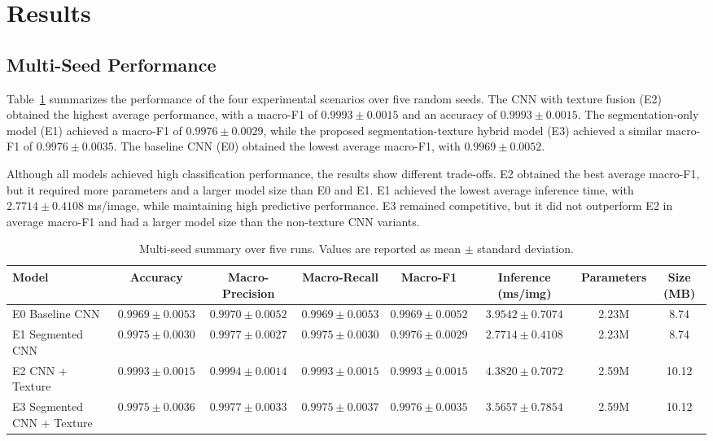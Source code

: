 \section{Results}

\subsection{Multi-Seed Performance}

Table~\ref{tab:multiseed} summarizes the performance of the four experimental scenarios over five random seeds. The CNN with texture fusion (E2) obtained the highest average performance, with a macro-F1 of $0.9993 \pm 0.0015$ and an accuracy of $0.9993 \pm 0.0015$. The segmentation-only model (E1) achieved a macro-F1 of $0.9976 \pm 0.0029$, while the proposed segmentation-texture hybrid model (E3) achieved a similar macro-F1 of $0.9976 \pm 0.0035$. The baseline CNN (E0) obtained the lowest average macro-F1, with $0.9969 \pm 0.0052$.

Although all models achieved high classification performance, the results show different trade-offs. E2 obtained the best average macro-F1, but it required more parameters and a larger model size than E0 and E1. E1 achieved the lowest average inference time, with $2.7714 \pm 0.4108$ ms/image, while maintaining high predictive performance. E3 remained competitive, but it did not outperform E2 in average macro-F1 and had a larger model size than the non-texture CNN variants.

\begin{table}[t]
\caption{Multi-seed summary over five runs. Values are reported as mean $\pm$ standard deviation.}
\label{tab:multiseed}
\centering
\footnotesize
\begin{adjustbox}{width=\textwidth}
\begin{tabular}{lccccccc}
\toprule
Model & Accuracy & Macro-Precision & Macro-Recall & Macro-F1 & Inference (ms/img) & Parameters & Size (MB) \\
\midrule
E0 Baseline CNN &
$0.9969 \pm 0.0053$ &
$0.9970 \pm 0.0052$ &
$0.9969 \pm 0.0053$ &
$0.9969 \pm 0.0052$ &
$3.9542 \pm 0.7074$ &
2.23M &
8.74 \\

E1 Segmented CNN &
$0.9975 \pm 0.0030$ &
$0.9977 \pm 0.0027$ &
$0.9975 \pm 0.0030$ &
$0.9976 \pm 0.0029$ &
$2.7714 \pm 0.4108$ &
2.23M &
8.74 \\

E2 CNN + Texture &
$\mathbf{0.9993 \pm 0.0015}$ &
$\mathbf{0.9994 \pm 0.0014}$ &
$\mathbf{0.9993 \pm 0.0015}$ &
$\mathbf{0.9993 \pm 0.0015}$ &
$4.3820 \pm 0.7072$ &
2.59M &
10.12 \\

E3 Segmented CNN + Texture &
$0.9975 \pm 0.0036$ &
$0.9977 \pm 0.0033$ &
$0.9975 \pm 0.0037$ &
$0.9976 \pm 0.0035$ &
$3.5657 \pm 0.7854$ &
2.59M &
10.12 \\
\bottomrule
\end{tabular}
\end{adjustbox}
\end{table}

